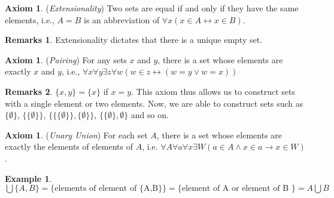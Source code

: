 \documentclass[14pt]{article}
\theoremstyle{definition}
\newtheorem*{remark}{Remarks}
\newtheorem*{example}{Example}
\newtheorem{axiom}[definition]{Axiom}
\begin{document}
\vspace{2mm}

\begin{axiom}
    (\textit{Extensionality}) Two sets are equal if and only if they have the same elements, i.e., $A=B$ is an abbreviation of $\forall x(x\in A \leftrightarrow x\in B )$.
\end{axiom}
\begin{remark}
    Extensionality dictates that there is a unique empty set.
\end{remark}

\vspace{2mm}

\begin{axiom}
    (\textit{Pairing}) For any sets $x$ and $y$, there is a set whose elements are exactly $x$ and $y$, i.e.,  $\forall x\forall y\exists z\forall w(w\in z \leftrightarrow (w=y\lor w=x))$
\end{axiom}
\begin{remark}
    $\lbrace x,y \rbrace =\lbrace x\rbrace$ if $x=y$. This axiom thus allows us to construct sets with a single element or two elements. Now, we are able to construct sets such as $\{\emptyset\}$, $\big\{ \{\emptyset\}\big\}$, $\Big\{\big\{ \{\emptyset\}\big\}, \{\emptyset\}\Big\}$, $\big\{\{\emptyset\}, \emptyset\big\}$ and so on.
\end{remark}

\vspace{2mm}

\begin{axiom}
    (\textit{Unary Union}) For each set $A$, there is a set whose elements are exactly the elements of elements of $A$, i.e.  $\forall A\forall a\forall x\exists W(a\in A \land x\in a \rightarrow x\in W)$.
\end{axiom}

\begin{example}
    $\bigcup\{A,B\}=\big\{ \text{elements of element of \{A,B\} }\big\}=\big\{ \text{element of A or element of B }\big\}=A\bigcup B$
\end{example}
\end{document}
